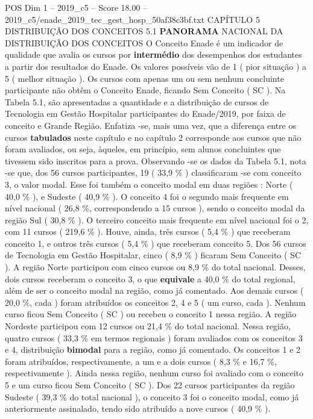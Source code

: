 \begin{textsample}{POS Dim 1 – 2019\_c5 – Score 18.00 – 2019\_c5/enade\_2019\_tec\_gest\_hosp\_50af38c3bf.txt}  \label{ex:f1_pos_045}
CAPÍTULO 5 DISTRIBUIÇÃO DOS CONCEITOS 5.1 \textbf{PANORAMA} NACIONAL DA DISTRIBUIÇÃO DOS CONCEITOS O Conceito Enade é um indicador de qualidade que avalia os cursos por \textbf{intermédio} dos desempenhos dos estudantes a partir dos resultados do Enade.
Os valores possíveis vão de 1 ( pior situação ) a 5 ( melhor situação ).
Os cursos com apenas um ou sem nenhum concluinte participante não obtêm o Conceito Enade, ficando Sem Conceito ( SC ).
Na Tabela 5.1, são apresentadas a quantidade e a distribuição de cursos de Tecnologia em Gestão Hospitalar participantes do Enade/2019, por faixa de conceito e Grande Região.
Enfatiza -se, mais uma vez, que a diferença entre os cursos \textbf{tabulados} neste capítulo e no capítulo 2 corresponde aos cursos que não foram avaliados, ou seja, àqueles, em princípio, sem alunos concluintes que tivessem sido inscritos para a prova.
Observando -se os dados da Tabela 5.1, nota -se que, dos 56 cursos participantes, 19 ( 33,9 \% ) classificaram -se com conceito 3, o valor modal.
Esse foi também o conceito modal em duas regiões : Norte ( 40,0 \% ), e Sudeste ( 40,9 \% ).
O conceito 4 foi o segundo mais frequente em nível nacional ( 26,8 \%, correspondendo a 15 cursos ), sendo o conceito modal da região Sul ( 30,8 \% ).
O terceiro conceito mais frequente em nível nacional foi o 2, com 11 cursos ( 219,6 \% ).
Houve, ainda, três cursos ( 5,4 \% ) que receberam conceito 1, e outros três cursos ( 5,4 \% ) que receberam conceito 5.
Dos 56 cursos de Tecnologia em Gestão Hospitalar, cinco ( 8,9 \% ) ficaram Sem Conceito ( SC ).
A região Norte participou com cinco cursos ou 8,9 \% do total nacional.
Desses, dois cursos receberam o conceito 3, o que \textbf{equivale} a 40,0 \% do total regional, além de ser o conceito modal na região, como já comentado.
Aos demais cursos ( 20,0 \%, cada ) foram atribuídos os conceitos 2, 4 e 5 ( um curso, cada ).
Nenhum curso ficou Sem Conceito ( SC ) ou recebeu o conceito 1 nessa região.
A região Nordeste participou com 12 cursos ou 21,4 \% do total nacional.
Nessa região, quatro cursos ( 33,3 \% em termos regionais ) foram avaliados com os conceitos 3 e 4, distribuição \textbf{bimodal} para a região, como já comentado.
Os conceitos 1 e 2 foram atribuídos, respectivamente, a um e a dois cursos ( 8,3 \% e 16,7 \%, respectivamente ).
Ainda nessa região, nenhum curso foi avaliado com o conceito 5 e um curso ficou Sem Conceito ( SC ).
Dos 22 cursos participantes da região Sudeste ( 39,3 \% do total nacional ), o conceito 3 foi o conceito modal, como já anteriormente assinalado, tendo sido atribuído a nove cursos ( 40,9 \% ).

\end{textsample}
